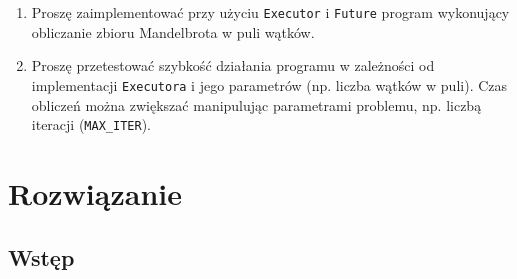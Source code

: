 \documentclass[11pt]{article}
\providecommand{\tightlist}{%
      \setlength{\itemsep}{0pt}\setlength{\parskip}{0pt}}
\begin{document}
\begin{enumerate}
\def\labelenumi{\arabic{enumi}.}
\tightlist
\item
  Proszę zaimplementować przy użyciu \texttt{Executor} i \texttt{Future}
  program wykonujący obliczanie zbioru Mandelbrota w puli wątków.
\item
  Proszę przetestować szybkość działania programu w zależności od
  implementacji \texttt{Executora} i jego parametrów (np. liczba wątków
  w puli). Czas obliczeń można zwiększać manipulując parametrami
  problemu, np. liczbą iteracji (\texttt{MAX\_ITER}).
\end{enumerate}

    \hypertarget{rozwiux105zanie}{%
\section{Rozwiązanie}\label{rozwiux105zanie}}

    \hypertarget{wstux119p}{%
\subsection{Wstęp}\label{wstux119p}}
\end{document}
